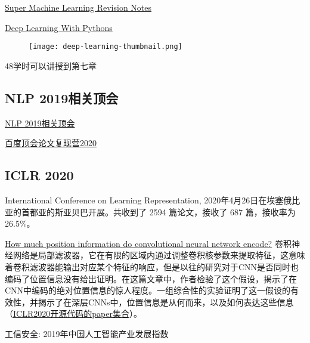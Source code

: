 \begin{pre}
\href{https://createmomo.github.io/2018/01/23/Super-Machine-Learning-Revision-Notes/#tableofcontents}{Super Machine Learning Revision Notes }

\href{https://pytorch.org/assets/deep-learning/Deep-Learning-with-PyTorch.pdf}{Deep Learning With Pythons}
\begin{figure}[htbp]
    \texttt{[image: deep-learning-thumbnail.png]}
\end{figure}

48学时可以讲授到第七章

\subsection{NLP 2019相关顶会}
\href{https://github.com/zggl/NLP-Conferences-Code}{NLP 2019相关顶会}

\href{https://live.bilibili.com/21689802}{百度顶会论文复现营2020}
\subsection{ICLR 2020}
International Conference on Learning Representation, 2020年4月26日在埃塞俄比亚的首都亚的斯亚贝巴开展。共收到了 2594 篇论文，接收了 687 篇，接收率为 26.5\%。

\href{https://openreview.net/forum?id=rJeB36NKvB}{How much position information do convolutional neural network encode?}
卷积神经网络是局部滤波器，它在有限的区域内通过调整卷积核参数来提取特征，这意味着卷积滤波器能输出对应某个特征的响应，但是以往的研究对于CNN是否同时也编码了位置信息没有给出证明。在这篇文章中，作者检验了这个假设，揭示了在CNN中编码的绝对位置信息的惊人程度。一组综合性的实验证明了这一假设的有效性，并揭示了在深层CNNs中，位置信息是从何而来，以及如何表达这些信息（\href{https://www.paperdigest.org/2019/12/iclr-2020-papers-with-code/}{ICLR2020开源代码的paper集合}）。

工信安全: 2019年中国人工智能产业发展指数
\end{pre} 